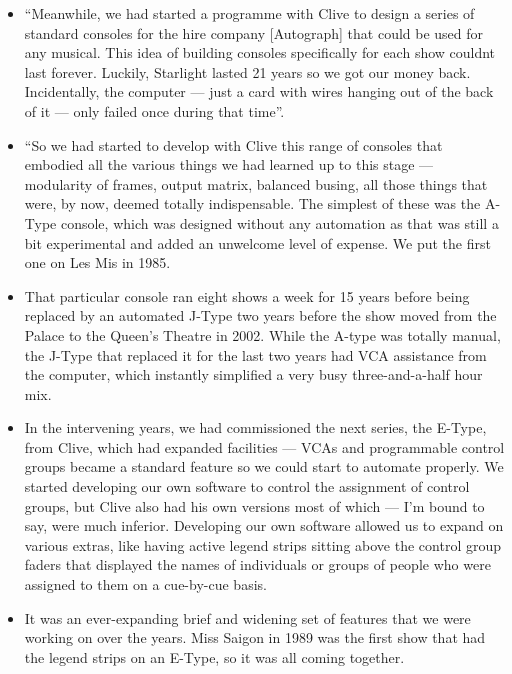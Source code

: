 \documentclass[12pt]{article}
\begin{document}
\begin{itemize}
            \item ``Meanwhile, we had started a programme with Clive to design a series of standard consoles for the hire company [Autograph] that could be used for any musical. This idea of building consoles specifically for each show couldnt last forever. Luckily, Starlight lasted 21 years so we got our money back. Incidentally, the computer --- just a card with wires hanging out of the back of it --- only failed once during that time''.
            \item ``So we had started to develop with Clive this range of consoles that embodied all the various things we had learned up to this stage --- modularity of frames, output matrix, balanced busing, all those things that were, by now, deemed totally indispensable. The simplest of these was the A-Type console, which was designed without any automation as that was still a bit experimental and added an unwelcome level of expense. We put the first one on Les Mis in 1985.
            \item That particular console ran eight shows a week for 15 years before being replaced by an automated J-Type two years before the show moved from the Palace to the Queen's Theatre in 2002. While the A-type was totally manual, the J-Type that replaced it for the last two years had VCA assistance from the computer, which instantly simplified a very busy three-and-a-half hour mix.
            \item In the intervening years, we had commissioned the next series, the E-Type, from Clive, which had expanded facilities --- VCAs and programmable control groups became a standard feature so we could start to automate properly. We started developing our own software to control the assignment of control groups, but Clive also had his own versions most of which --- I'm bound to say, were much inferior. Developing our own software allowed us to expand on various extras, like having active legend strips sitting above the control group faders that displayed the names of individuals or groups of people who were assigned to them on a cue-by-cue basis.
            \item It was an ever-expanding brief and widening set of features that we were working on over the years. Miss Saigon in 1989 was the first show that had the legend strips on an E-Type, so it was all coming together.

\end{itemize}
\end{document}
